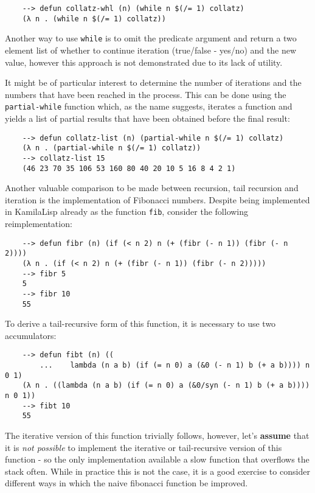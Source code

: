 \begin{Verbatim}
    --> defun collatz-whl (n) (while n $(/= 1) collatz)
    (λ n . (while n $(/= 1) collatz))
\end{Verbatim}

Another way to use \verb|while| is to omit the predicate argument and return a two element list of whether to continue iteration (true/false - yes/no) and the new value, however this approach is not demonstrated due to its lack of utility.

It might be of particular interest to determine the number of iterations and the numbers that have been reached in the process. This can be done using the \verb|partial-while| function which, as the name suggests, iterates a function and yields a list of partial results that have been obtained before the final result:

\begin{Verbatim}
    --> defun collatz-list (n) (partial-while n $(/= 1) collatz)
    (λ n . (partial-while n $(/= 1) collatz))
    --> collatz-list 15
    (46 23 70 35 106 53 160 80 40 20 10 5 16 8 4 2 1)
\end{Verbatim}

Another valuable comparison to be made between recursion, tail recursion and iteration is the implementation of Fibonacci numbers. Despite being implemented in KamilaLisp already as the function \verb|fib|, consider the following reimplementation:

\begin{Verbatim}
    --> defun fibr (n) (if (< n 2) n (+ (fibr (- n 1)) (fibr (- n 2))))
    (λ n . (if (< n 2) n (+ (fibr (- n 1)) (fibr (- n 2)))))
    --> fibr 5
    5
    --> fibr 10
    55
\end{Verbatim}

To derive a tail-recursive form of this function, it is necessary to use two accumulators:

\begin{Verbatim}
    --> defun fibt (n) ((
        ...    lambda (n a b) (if (= n 0) a (&0 (- n 1) b (+ a b)))) n 0 1)
    (λ n . ((lambda (n a b) (if (= n 0) a (&0/syn (- n 1) b (+ a b)))) n 0 1))
    --> fibt 10
    55
\end{Verbatim}

The iterative version of this function trivially follows, however, let's \textbf{assume} that it is \textit{not possible} to implement the iterative or tail-recursive version of this function - so the only implementation available a slow function that overflows the stack often. While in practice this is not the case, it is a good exercise to consider different ways in which the naive fibonacci function be improved.

